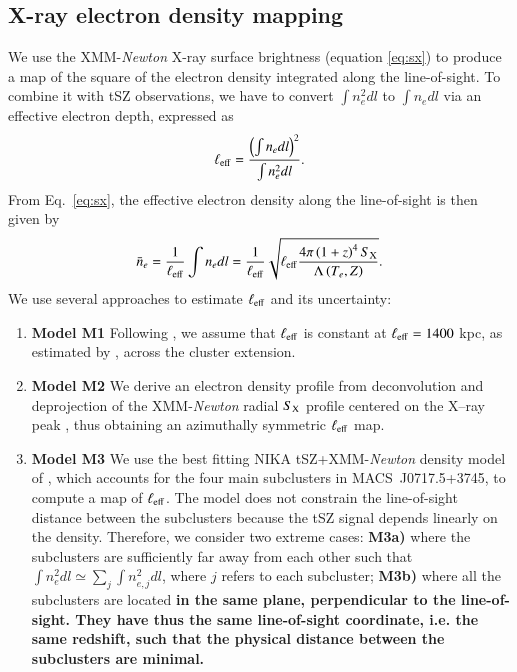 \documentclass[twocolumn,traditabstract]{aa}
\begin{document}

\subsection{X-ray electron density mapping}
We use the XMM-\textit{Newton} X-ray surface brightness (equation \ref{eq:sx}) to produce a map of the square of the electron density integrated along the line-of-sight. To combine it with tSZ observations, we have to convert $\int n_e^2 dl$ to $\int n_e dl$ via an effective electron depth, expressed as
\begin{equation}
	\ell_{\rm eff} = \frac{\left(\int n_e dl\right)^2}{\int n_e^2 dl}.
\label{eq:l_eff}
\end{equation}
From Eq.~\ref{eq:sx}, the effective electron density along the line-of-sight is then given by
\begin{equation}
	\bar{n}_e = \frac{1}{\ell_{\rm eff}} \int n_e dl = \frac{1}{\ell_{\rm eff}}\sqrt{\ell_{\rm eff} \frac{4 \pi \left(1+z\right)^4 S_{\rm X}}{\Lambda\left(T_e, Z\right)}}.
\label{eq:pseudo_ne}
\end{equation}
We use several approaches to estimate $\ell_{\rm eff}$ and its uncertainty:
\begin{enumerate}
\item {\bf Model M1} Following \cite{Sayers2013}, we assume that $\ell_{\rm eff}$ is constant at $\ell_{\rm eff}=1400$ kpc, as estimated by \citet{Mroczkowski2012}, across the cluster extension. 
\item {\bf Model M2} We derive an electron density profile from deconvolution and deprojection of the XMM-\textit{Newton} radial $S_{\rm X}$ profile centered on the X--ray peak \citep{Croston2006}, thus obtaining an azimuthally symmetric $\ell_{\rm eff}$ map. 
\item {\bf Model M3} We use the best fitting NIKA tSZ+XMM-\textit{Newton} density model of \cite{Adam2016b}, which accounts for the four main subclusters in \mbox{MACS~J0717.5+3745}, to compute a map of $\ell_{\rm eff}$. The model does not constrain the line-of-sight distance between the subclusters because the tSZ signal depends linearly on the density. Therefore, we consider two extreme cases: {\bf M3a)} where the subclusters are sufficiently far away from each other such that $\int n_e^2 dl \simeq \sum_j \int n_{e,j}^2 dl$, where $j$ refers to each subcluster; {\bf M3b)} where all the subclusters are located {\bf in the same plane, perpendicular to the line-of-sight. They have thus the same line-of-sight coordinate, i.e. the same redshift, such that the physical distance between the subclusters are minimal.}
\end{enumerate}
\end{document}
